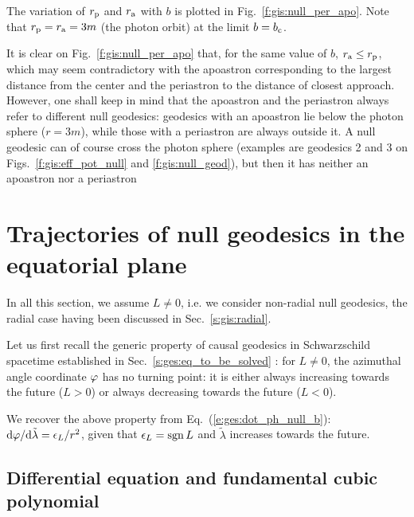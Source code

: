The variation of $r_{\rm p}$ and $r_{\rm a}$ with $b$ is plotted
in Fig.~\ref{f:gis:null_per_apo}. Note that $r_{\rm p} = r_{\rm a} = 3 m$
(the photon orbit) at the limit $b = b_{\rm c}$.
\begin{remark}
It is clear on Fig.~\ref{f:gis:null_per_apo} that, for the same value of $b$,
$r_{\rm a} \leq r_{\rm p}$, which may seem contradictory with the apoastron
corresponding to the largest distance from the center and the periastron to
the distance of closest approach.
However, one shall keep in mind that the apoastron and the periastron always refer to different null
geodesics: geodesics with an apoastron lie below the photon sphere ($r=3m$), while those
with a periastron are always outside it. A null geodesic can of course cross
the photon sphere (examples are geodesics 2 and 3 on Figs.~\ref{f:gis:eff_pot_null}
and \ref{f:gis:null_geod}), but then it has neither an apoastron nor a periastron
\end{remark}


\section{Trajectories of null geodesics in the equatorial plane} \label{s:gis:planar_trajectories}

In all this section, we assume $L\not = 0$, i.e. we consider non-radial
null geodesics, the radial case having been discussed in Sec.~\ref{s:gis:radial}.

Let us first recall the generic property of causal geodesics in Schwarzschild
spacetime established in Sec.~\ref{s:ges:eq_to_be_solved} : for $L\not=0$,
the azimuthal angle coordinate $\varphi$ has no turning point: it is either always increasing
towards the future
($L>0$) or always decreasing towards the future ($L<0$).
\begin{remark}
We recover the above property from Eq.~(\ref{e:ges:dot_ph_null_b}):
$\mathrm{d}\varphi/\mathrm{d}\tilde{\lambda} = \epsilon_L/r^2$, given that
$\epsilon_L = \operatorname{sgn} L$ and $\tilde{\lambda}$ increases towards
the future.
\end{remark}

\subsection{Differential equation and fundamental cubic polynomial}
\label{s:gis:cubic_poly}

